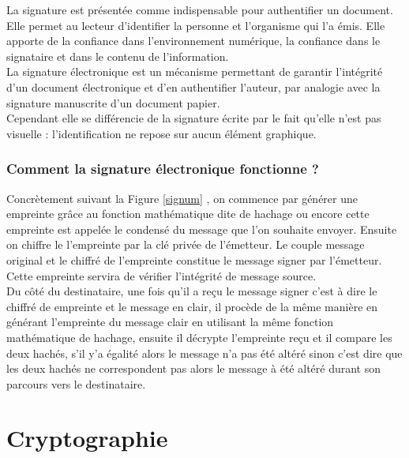                 La signature est présentée comme indispensable pour authentifier un document. Elle permet au lecteur d’identifier la personne et l’organisme qui l’a émis. Elle apporte de la confiance dans l’environnement numérique, la confiance dans le signataire et dans le contenu de l’information.\\
                
                La signature électronique est un mécanisme permettant de garantir l'intégrité d'un document électronique et d'en authentifier l'auteur, par analogie avec la signature manuscrite d'un document papier.\\
                
                Cependant elle se différencie de la signature écrite par le fait qu'elle n'est pas visuelle : l’identification ne repose sur aucun élément graphique.
                
                         \subsubsection*{Comment la signature électronique fonctionne ?}
                
                    Concrètement suivant la Figure \ref{signum} , on commence par générer une empreinte grâce au fonction mathématique dite de hachage ou encore cette empreinte est appelée le condensé du message que l'on souhaite envoyer. Ensuite on chiffre le l'empreinte par la clé privée de l'émetteur. Le couple message original et le chiffré de l'empreinte constitue le message signer par l'émetteur. Cette empreinte servira de vérifier l'intégrité de message source.\\
                
                Du côté du destinataire, une fois qu'il a reçu le message signer c'est à dire le chiffré de empreinte et le message en clair, il procède de la même manière en générant l'empreinte du message clair en utilisant la même fonction mathématique de hachage, ensuite il décrypte l'empreinte reçu et il compare les deux hachés, s'il y'a égalité alors le message n'a pas été altéré sinon c'est dire que les deux hachés ne correspondent pas alors le message à été altéré durant son parcours vers le destinataire.
                
	\section{Cryptographie}
